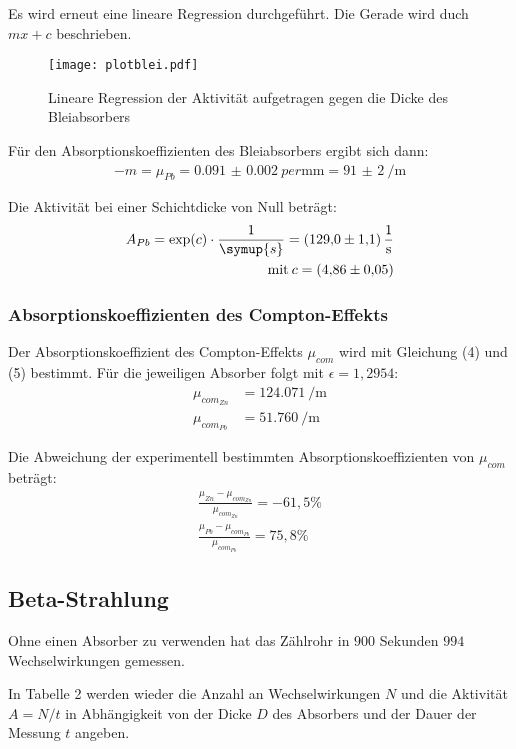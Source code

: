 Es wird erneut eine lineare Regression durchgeführt. Die Gerade wird duch $mx + c$ beschrieben.

\begin{figure}[H]
  \centering
  \texttt{[image: plotblei.pdf]}
  \caption{Lineare Regression der Aktivität aufgetragen gegen die Dicke des Bleiabsorbers}
  \label{fig:plot}
\end{figure}


Für den Absorptionskoeffizienten des Bleiabsorbers ergibt sich dann:
\begin{align*}
  -m = \mu_{Pb} = \SI{0.091(2)}{per\milli\meter} = \SI{91(2)}{\per\meter}
\end{align*}

Die Aktivität bei einer Schichtdicke von Null beträgt:
\begin{align*}
  A_{Pb} = \exp(c) \cdot \frac{1}{\symup{s}} = \SI{129.0(11)}{\per\second} \\
  \text{mit} \: c = \SI{4.86(5)}{}
\end{align*}

\subsubsection{Absorptionskoeffizienten des Compton-Effekts}

Der Absorptionskoeffizient des Compton-Effekts $\mu_{com}$ wird mit Gleichung (4) und (5) bestimmt. Für die jeweiligen Absorber
folgt mit $\epsilon = 1,2954$:
\begin{align*}
\mu_{com_{Zn}} &= \SI{124.071}{\per\meter}  \\
\mu_{com_{Pb}} &= \SI{51,760}{\per\meter}
\end{align*}

Die Abweichung der experimentell bestimmten Absorptionskoeffizienten von $\mu_{com}$ beträgt:
\begin{align*}
  \frac{\mu_{Zn}- \mu_{com_{Zn}}}{\mu_{com_{Zn}}} = -61,5 \% \\
  \frac{\mu_{Pb}- \mu_{com_{Pb}}}{\mu_{com_{Pb}}} = 75,8 \%
\end{align*}


\subsection{Beta-Strahlung}

Ohne einen Absorber zu verwenden hat das Zählrohr in $900$ Sekunden $994$ Wechselwirkungen gemessen.

In Tabelle 2 werden wieder die Anzahl an Wechselwirkungen $N$ und die Aktivität $A = N/t$ in Abhängigkeit von der Dicke $D$ des Absorbers und der
Dauer der Messung $t$ angeben.

